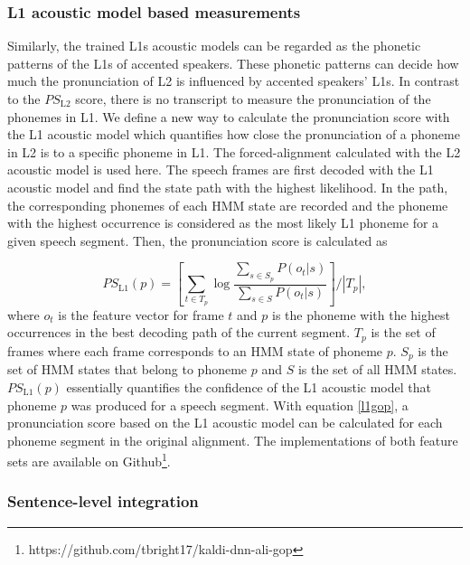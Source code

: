 \subsubsection{L1 acoustic model based measurements}
\label{sec:L1_measure}

Similarly, the trained L1s acoustic models can be regarded as the phonetic patterns of the L1s of accented speakers. These phonetic patterns can decide how much the pronunciation of L2 is influenced by accented speakers' L1s. In contrast to the $PS_{\mathrm{L2}}$ score, there is no transcript to measure the pronunciation of the phonemes in L1. We define a new way to calculate the pronunciation score with the L1 acoustic model which quantifies how close the pronunciation of a phoneme in L2 is to a specific phoneme in L1. The forced-alignment calculated with the L2 acoustic model is used here. The speech frames are first decoded with the L1 acoustic model and find the state path with the highest likelihood. In the path, the corresponding phonemes of each HMM state are recorded and the phoneme with the highest occurrence is considered as the most likely L1 phoneme for a given speech segment. Then, the pronunciation score is calculated as

\begin{equation}
\label{l1gop}
PS_{\mathrm{L1}}(p) = \left [ \sum_{t \in T_p} \log \frac{ \sum_{s \in S_p}P(o_t|s)}  { \sum_{s \in S}P(o_t|s)} \right ] /\left | T_p \right |,
\end{equation}
where $o_t$ is the feature vector for frame $t$ and $p$ is the phoneme with the highest occurrences in the best decoding path of the current segment. $T_p$ is the set of frames where each frame corresponds to an HMM state of phoneme $p$. $S_p$ is the set of HMM states that belong to phoneme $p$ and $S$ is the set of all HMM states. $PS_{\mathrm{L1}}(p)$ essentially quantifies the confidence of the L1 acoustic model that phoneme $p$ was produced for a speech segment. With equation \ref{l1gop}, a pronunciation score based on the L1 acoustic model can be calculated for each phoneme segment in the original alignment. The implementations of both feature sets are available on Github\footnote{https://github.com/tbright17/kaldi-dnn-ali-gop}.

\subsubsection{Sentence-level integration}

